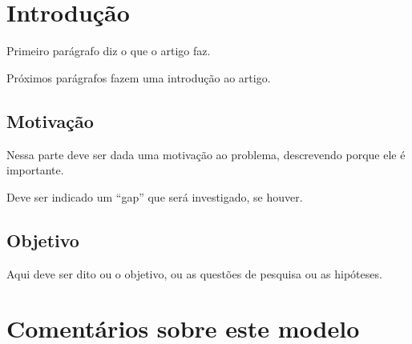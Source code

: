 \section{Introdução}

Primeiro parágrafo diz o que o artigo faz.

Próximos parágrafos fazem uma introdução ao artigo.

\subsection{Motivação}

Nessa parte deve ser dada uma motivação ao problema, descrevendo porque ele é importante.

Deve ser indicado um ``gap'' que será investigado, se houver.

\subsection{Objetivo}

Aqui deve ser dito ou o objetivo, ou as questões de pesquisa ou as hipóteses.

\section{Comentários sobre este modelo}

